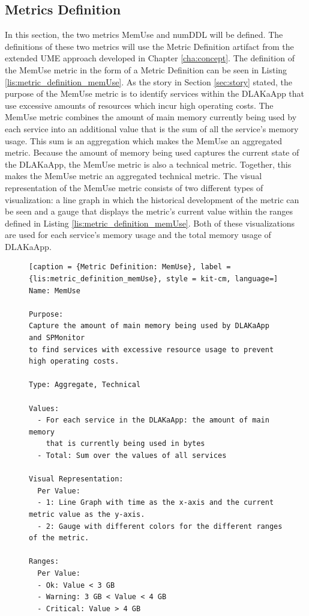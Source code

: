 \subsection{Metrics Definition}

In this section, the two metrics MemUse and numDDL will be defined.
The definitions of these two metrics will use the Metric Definition artifact
from the extended UME approach developed in Chapter \ref{cha:concept}.
The definition of the MemUse metric in the form of a
Metric Definition can be seen in Listing \ref{lis:metric_definition_memUse}.
As the story in Section \ref{sec:story} stated, the purpose of the MemUse metric
is to identify services within the DLAKaApp that use excessive amounts of resources
which incur high operating costs.
The MemUse metric combines the amount of main memory currently being used by each service
into an additional value that is the sum of all the service's memory usage. This sum
is an aggregation which makes the MemUse an aggregated metric.
Because the amount of memory being used captures the current state of the DLAKaApp,
the MemUse metric is also a technical metric. Together, this makes the MemUse metric
an aggregated technical metric. The visual representation of the MemUse metric
consists of two different types of visualization: a line graph in which the historical
development of the metric can be seen and a gauge that displays the metric's current value
within the ranges defined in Listing \ref{lis:metric_definition_memUse}.
Both of these visualizations are used for each service's memory usage
and the total memory usage of DLAKaApp.

\begin{figure}[tb]
\begin{lstlisting}[caption = {Metric Definition: MemUse}, label = {lis:metric_definition_memUse}, style = kit-cm, language=]
Name: MemUse

Purpose:
Capture the amount of main memory being used by DLAKaApp and SPMonitor
to find services with excessive resource usage to prevent high operating costs.

Type: Aggregate, Technical

Values:
  - For each service in the DLAKaApp: the amount of main memory
    that is currently being used in bytes
  - Total: Sum over the values of all services

Visual Representation:
  Per Value:
  - 1: Line Graph with time as the x-axis and the current metric value as the y-axis.
  - 2: Gauge with different colors for the different ranges of the metric.

Ranges:
  Per Value:
  - Ok: Value < 3 GB
  - Warning: 3 GB < Value < 4 GB
  - Critical: Value > 4 GB
\end{lstlisting}
\end{figure}

